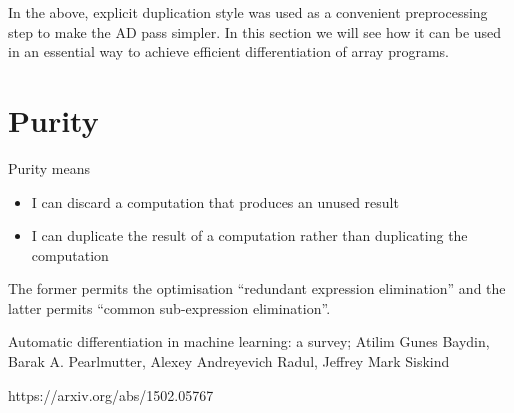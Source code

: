 \documentclass[12pt]{article}
\begin{document}
In the above, explicit duplication style was used as a convenient
preprocessing step to make the AD pass simpler.  In this section we
will see how it can be used in an essential way to achieve efficient
differentiation of array programs.

\section{Purity}

Purity means

\begin{itemize}
 \item I can discard a computation that produces an unused result
 \item I can duplicate the result of a computation rather than
   duplicating the computation
\end{itemize}

The former permits the optimisation ``redundant expression
elimination'' and the latter permits ``common sub-expression
elimination''.

\begin{thebibliography}{9}

  Automatic differentiation in machine learning: a survey;
  Atilim Gunes Baydin, Barak A. Pearlmutter, Alexey Andreyevich Radul, Jeffrey Mark Siskind
  
https://arxiv.org/abs/1502.05767
  
\end{thebibliography}
\end{document}
